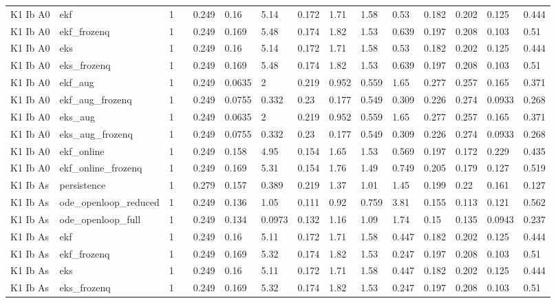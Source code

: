 \begin{table}[t]
\begin{tabular}{lllllllllllllll}
K1 Ib A0 & ekf & 1 &  & 0.249 & 0.16 & 5.14 & 0.172 & 1.71 & 1.58 & 0.53 & 0.182 & 0.202 & 0.125 & 0.444 \\
K1 Ib A0 & ekf\_frozenq & 1 &  & 0.249 & 0.169 & 5.48 & 0.174 & 1.82 & 1.53 & 0.639 & 0.197 & 0.208 & 0.103 & 0.51 \\
K1 Ib A0 & eks & 1 &  & 0.249 & 0.16 & 5.14 & 0.172 & 1.71 & 1.58 & 0.53 & 0.182 & 0.202 & 0.125 & 0.444 \\
K1 Ib A0 & eks\_frozenq & 1 &  & 0.249 & 0.169 & 5.48 & 0.174 & 1.82 & 1.53 & 0.639 & 0.197 & 0.208 & 0.103 & 0.51 \\
K1 Ib A0 & ekf\_aug & 1 &  & 0.249 & 0.0635 & 2 & 0.219 & 0.952 & 0.559 & 1.65 & 0.277 & 0.257 & 0.165 & 0.371 \\
K1 Ib A0 & ekf\_aug\_frozenq & 1 &  & 0.249 & 0.0755 & 0.332 & 0.23 & 0.177 & 0.549 & 0.309 & 0.226 & 0.274 & 0.0933 & 0.268 \\
K1 Ib A0 & eks\_aug & 1 &  & 0.249 & 0.0635 & 2 & 0.219 & 0.952 & 0.559 & 1.65 & 0.277 & 0.257 & 0.165 & 0.371 \\
K1 Ib A0 & eks\_aug\_frozenq & 1 &  & 0.249 & 0.0755 & 0.332 & 0.23 & 0.177 & 0.549 & 0.309 & 0.226 & 0.274 & 0.0933 & 0.268 \\
K1 Ib A0 & ekf\_online & 1 &  & 0.249 & 0.158 & 4.95 & 0.154 & 1.65 & 1.53 & 0.569 & 0.197 & 0.172 & 0.229 & 0.435 \\
K1 Ib A0 & ekf\_online\_frozenq & 1 &  & 0.249 & 0.169 & 5.31 & 0.154 & 1.76 & 1.49 & 0.749 & 0.205 & 0.179 & 0.127 & 0.519 \\
K1 Ib As & persistence & 1 &  & 0.279 & 0.157 & 0.389 & 0.219 & 1.37 & 1.01 & 1.45 & 0.199 & 0.22 & 0.161 & 0.127 \\
K1 Ib As & ode\_openloop\_reduced & 1 &  & 0.249 & 0.136 & 1.05 & 0.111 & 0.92 & 0.759 & 3.81 & 0.155 & 0.113 & 0.121 & 0.562 \\
K1 Ib As & ode\_openloop\_full & 1 &  & 0.249 & 0.134 & 0.0973 & 0.132 & 1.16 & 1.09 & 1.74 & 0.15 & 0.135 & 0.0943 & 0.237 \\
K1 Ib As & ekf & 1 &  & 0.249 & 0.16 & 5.11 & 0.172 & 1.71 & 1.58 & 0.447 & 0.182 & 0.202 & 0.125 & 0.444 \\
K1 Ib As & ekf\_frozenq & 1 &  & 0.249 & 0.169 & 5.32 & 0.174 & 1.82 & 1.53 & 0.247 & 0.197 & 0.208 & 0.103 & 0.51 \\
K1 Ib As & eks & 1 &  & 0.249 & 0.16 & 5.11 & 0.172 & 1.71 & 1.58 & 0.447 & 0.182 & 0.202 & 0.125 & 0.444 \\
K1 Ib As & eks\_frozenq & 1 &  & 0.249 & 0.169 & 5.32 & 0.174 & 1.82 & 1.53 & 0.247 & 0.197 & 0.208 & 0.103 & 0.51 \\

\end{tabular}
\end{table}

